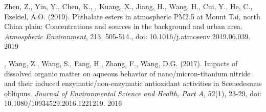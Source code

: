 \begin{cvpublications}
\publication
{Zhen, Z., Yin, Y., Chen, K., ,
Kuang, X., Jiang, H., Wang, H., Cui, Y., He, C., Ezekiel, A.O. (2019).
Phthalate esters in atmospheric PM2.5 at Mount Tai, north China plain:
Concentrations and sources in the background and urban area.
\emph{Atmospheric Environment},
213, 505-514.,
doi: 10.1016/j.atmosenv.2019.06.039.} %
{2019} %

\publication
{, Wang, Z., Wang, S., Fang, H., Zhang, F., Wang, D.G. (2017).
Impacts of dissolved organic matter on aqueous behavior of nano/micron-titanium nitride and their induced enzymatic/non-enzymatic antioxidant activities in Scenedesmus obliquus.
\emph{Journal of Environmental Science and Health, Part A},
52(1), 23-29,
doi: 10.1080/10934529.2016.1221219.} %
{2016} %

\end{cvpublications}
